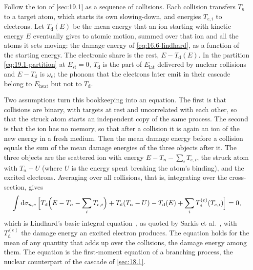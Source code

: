Follow the ion of \cref{sec:19.1} as a sequence of collisions. Each collision transfers $T_n$ to a target atom, which starts its own slowing-down, and energies $T_{e,i}$ to electrons. Let $T_{\mathrm{d}}(E)$ be the mean energy that an ion starting with kinetic energy $E$ eventually gives to atomic motion, summed over that ion and all the atoms it sets moving: the damage energy of \cref{eq:16.6-lindhard}, as a function of the starting energy. The electronic share is the rest, $E - T_{\mathrm{d}}(E)$. In the partition \cref{eq:19.1-partition} at $E_{\mathrm{st}} = 0$, $T_{\mathrm{d}}$ is the part of $E_{\mathrm{lat}}$ delivered by nuclear collisions and $E - T_{\mathrm{d}}$ is $\omega_e$; the phonons that the electrons later emit in their cascade belong to $E_{\mathrm{heat}}$ but not to $T_{\mathrm{d}}$.

Two assumptions turn this bookkeeping into an equation. The first is that collisions are binary, with targets at rest and uncorrelated with each other, so that the struck atom starts an independent copy of the same process. The second is that the ion has no memory, so that after a collision it is again an ion of the new energy in a fresh medium. Then the mean damage energy before a collision equals the sum of the mean damage energies of the three objects after it. The three objects are the scattered ion with energy $E - T_n - \sum_iT_{e,i}$, the struck atom with $T_n - U$ (where $U$ is the energy spent breaking the atom's binding), and the excited electrons. Averaging over all collisions, that is, integrating over the cross-section, gives
\begin{equation}
  \int\mathrm{d}\sigma_{n,e}\,\Bigl[T_{\mathrm{d}}\Bigl(E - T_n - \sum_iT_{e,i}\Bigr) + T_{\mathrm{d}}(T_n - U) - T_{\mathrm{d}}(E) + \sum_iT_{\mathrm{d}}^{(e)}(T_{e,i})\Bigr] = 0 ,
  \label{eq:19.3-basic}
\end{equation}
which is Lindhard's basic integral equation~\cite{lindhard1963integral}, as quoted by Sarkis et al.~\cite[Eq.~(3)]{sarkis2020study}, with $T_{\mathrm{d}}^{(e)}$ the damage energy an excited electron produces. The equation holds for the mean of any quantity that adds up over the collisions, the damage energy among them. The equation is the first-moment equation of a branching process, the nuclear counterpart of the cascade of \cref{sec:18.1}.

